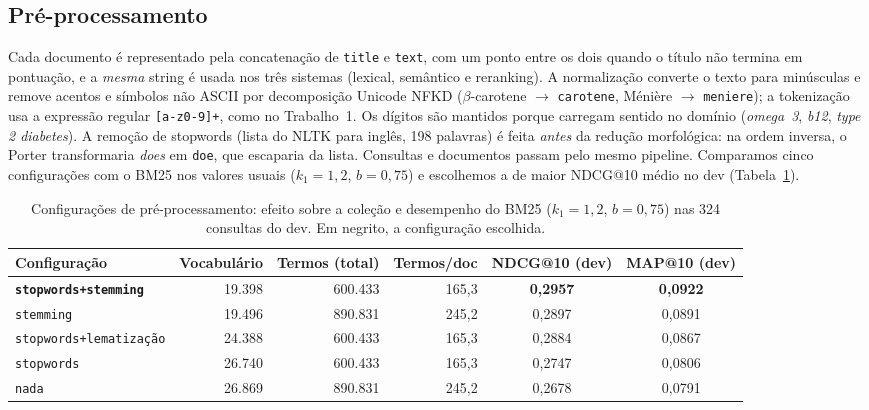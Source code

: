 \documentclass[10pt,a4paper]{article}
\begin{document}
\subsection{Pré-processamento}

Cada documento é representado pela concatenação de \texttt{title} e \texttt{text}, com um ponto entre os dois quando o título não termina em pontuação, e a \emph{mesma} string é usada nos três sistemas (lexical, semântico e reranking). A normalização converte o texto para minúsculas e remove acentos e símbolos não ASCII por decomposição Unicode NFKD ($\beta$-carotene $\to$ \texttt{carotene}, Ménière $\to$ \texttt{meniere}); a tokenização usa a expressão regular \texttt{[a-z0-9]+}, como no Trabalho~1. Os dígitos são mantidos porque carregam sentido no domínio (\emph{omega~3}, \emph{b12}, \emph{type 2 diabetes}). A remoção de stopwords (lista do NLTK para inglês, 198 palavras) é feita \emph{antes} da redução morfológica: na ordem inversa, o Porter transformaria \emph{does} em \texttt{doe}, que escaparia da lista. Consultas e documentos passam pelo mesmo pipeline. Comparamos cinco configurações com o BM25 nos valores usuais ($k_1 = 1{,}2$, $b = 0{,}75$) e escolhemos a de maior NDCG@10 médio no dev (Tabela~\ref{tab:preproc}).

\begin{table}[!htb]
\centering\small
\caption{Configurações de pré-processamento: efeito sobre a coleção e desempenho do BM25 ($k_1 = 1{,}2$, $b = 0{,}75$) nas 324 consultas do dev. Em negrito, a configuração escolhida.}
\label{tab:preproc}
\begin{tabular}{@{}lrrrcc@{}}
\toprule
Configuração & Vocabulário & Termos (total) & Termos/doc & NDCG@10 (dev) & MAP@10 (dev) \\
\midrule
\textbf{\texttt{stopwords+stemming}} & 19.398 & 600.433 & 165,3 & \textbf{0,2957} & \textbf{0,0922} \\
\texttt{stemming}                    & 19.496 & 890.831 & 245,2 & 0,2897 & 0,0891 \\
\texttt{stopwords+lematização}       & 24.388 & 600.433 & 165,3 & 0,2884 & 0,0867 \\
\texttt{stopwords}                   & 26.740 & 600.433 & 165,3 & 0,2747 & 0,0806 \\
\texttt{nada}                        & 26.869 & 890.831 & 245,2 & 0,2678 & 0,0791 \\
\bottomrule
\end{tabular}
\end{table}
\end{document}
